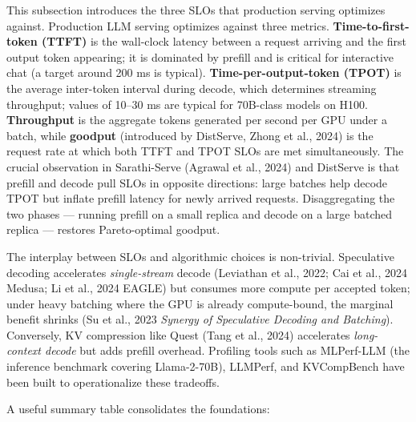 This subsection introduces the three SLOs that production serving optimizes against. Production LLM serving optimizes against three metrics. \textbf{Time-to-first-token (TTFT)} is the wall-clock latency between a request arriving and the first output token appearing; it is dominated by prefill and is critical for interactive chat (a target around 200 ms is typical). \textbf{Time-per-output-token (TPOT)} is the average inter-token interval during decode, which determines streaming throughput; values of 10--30 ms are typical for 70B-class models on H100. \textbf{Throughput} is the aggregate tokens generated per second per GPU under a batch, while \textbf{goodput} (introduced by DistServe, Zhong et al., 2024) is the request rate at which both TTFT and TPOT SLOs are met simultaneously. The crucial observation in Sarathi-Serve (Agrawal et al., 2024) and DistServe is that prefill and decode pull SLOs in opposite directions: large batches help decode TPOT but inflate prefill latency for newly arrived requests. Disaggregating the two phases --- running prefill on a small replica and decode on a large batched replica --- restores Pareto-optimal goodput.

The interplay between SLOs and algorithmic choices is non-trivial. Speculative decoding accelerates \emph{single-stream} decode (Leviathan et al., 2022; Cai et al., 2024 Medusa; Li et al., 2024 EAGLE) but consumes more compute per accepted token; under heavy batching where the GPU is already compute-bound, the marginal benefit shrinks (Su et al., 2023 \emph{Synergy of Speculative Decoding and Batching}). Conversely, KV compression like Quest (Tang et al., 2024) accelerates \emph{long-context decode} but adds prefill overhead. Profiling tools such as MLPerf-LLM (the inference benchmark covering Llama-2-70B), LLMPerf, and KVCompBench have been built to operationalize these tradeoffs.

A useful summary table consolidates the foundations:

